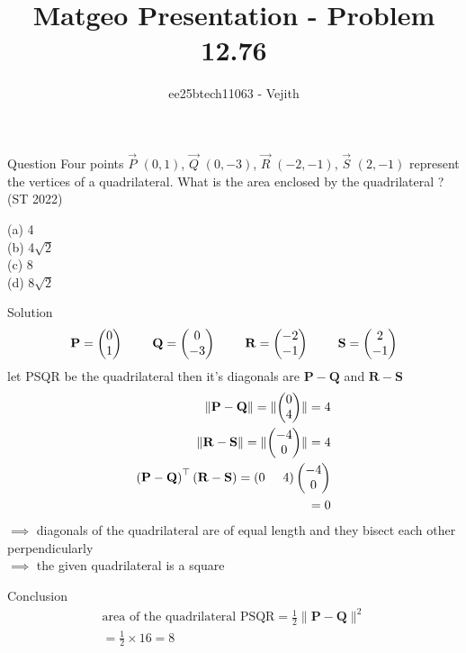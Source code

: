 \documentclass{beamer}
\title{Matgeo Presentation - Problem 12.76}
\author{ee25btech11063 - Vejith}
\numberwithin{equation}{section}
\providecommand{\brak}[1]{\ensuremath{\left(#1\right)}}
\theoremstyle{remark}
\providecommand{\norm}[1]{\lVert#1\rVert}
\newcommand{\myvec}[1]{\ensuremath{\begin{pmatrix}#1\end{pmatrix}}}
\let\vec\mathbf
\begin{document}
\frame{\titlepage}
\begin{frame}{Question}
Four points  $\Vec{P}$ \brak{0,1}, $\Vec{Q}$ \brak{0,-3}, $\Vec{R}$ \brak{-2,-1}, $\Vec{S}$ \brak{2,-1} represent the vertices of a quadrilateral. What is  the area enclosed by the quadrilateral ?
\hfill (ST 2022)

(a) 4 \\
(b) 4$\sqrt{2}$ \\
(c) 8 \\
(d) 8$\sqrt{2}$

\end{frame}

\begin{frame}{Solution}
    \begin{align}
\vec{P} = \myvec{0 \\ 1} \hspace{0.8cm}
\vec{Q} = \myvec{0 \\ -3} \hspace{0.8cm}
\vec{R} = \myvec{-2 \\ -1} \hspace{0.8cm}
\vec{S} = \myvec{2 \\ -1}
\end{align}
let PSQR be the quadrilateral then it's diagonals are $\vec{P}-\vec{Q}$ and $\vec{R}-\vec{S}$\\
\begin{align}
    \norm{\vec{P}-\vec{Q}}=\norm{\myvec{0\\4}}=4\\
    \norm{\vec{R}-\vec{S}}=\norm{\myvec{-4\\0}}=4\\
    \brak{\vec{P}-\vec{Q}}^{\top}\brak{\vec{R}-\vec{S}}=\brak{0\hspace{0.5cm} 4}\myvec{-4\\0}\\
    =0
    \end{align}
    $\implies$ diagonals of the quadrilateral are of equal length and they bisect each other perpendicularly \\
     $\implies$ the given quadrilateral is a square
\end{frame}

\begin{frame}{Conclusion}
     \begin{align}
         \text{area of the quadrilateral PSQR}=\frac{1}{2} \norm{\vec{P}-\vec{Q}}^2\\
         =\frac{1}{2}\times 16 =8
     \end{align}
\end{frame}
\end{document}
